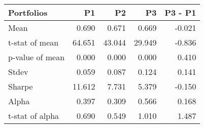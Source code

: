 \begin{tabular}{lrrrr}
\toprule
Portfolios & P1 & P2 & P3 & P3 - P1 \\
\midrule
Mean & 0.690 & 0.671 & 0.669 & -0.021 \\
t-stat of mean & 64.651 & 43.044 & 29.949 & -0.836 \\
p-value of mean & 0.000 & 0.000 & 0.000 & 0.410 \\
Stdev & 0.059 & 0.087 & 0.124 & 0.141 \\
Sharpe & 11.612 & 7.731 & 5.379 & -0.150 \\
Alpha & 0.397 & 0.309 & 0.566 & 0.168 \\
t-stat of alpha & 0.690 & 0.549 & 1.010 & 1.487 \\
\bottomrule
\end{tabular}
